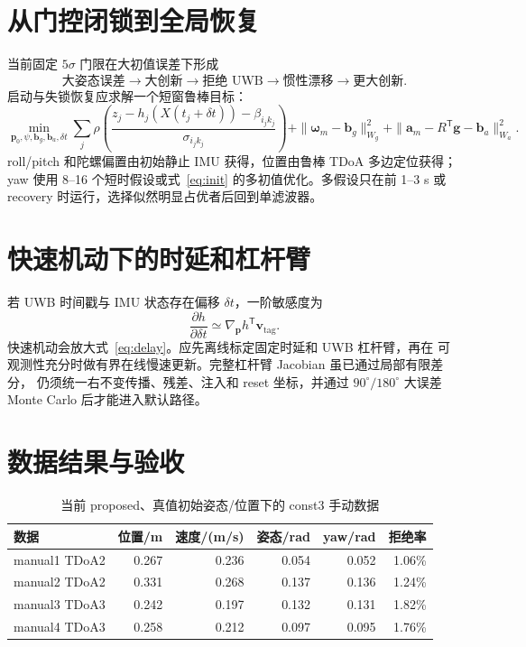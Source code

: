 \documentclass[11pt,a4paper]{ctexart}
\begin{document}
\section{从门控闭锁到全局恢复}

当前固定 $5\sigma$ 门限在大初值误差下形成
\[
\text{大姿态误差}\to\text{大创新}\to\text{拒绝 UWB}
\to\text{惯性漂移}\to\text{更大创新}.
\]
启动与失锁恢复应求解一个短窗鲁棒目标：
\begin{equation}
\min_{\bm p_0,\psi,\bm b_g,\bm b_a,\delta t}
\sum_j
\rho\!\left(
\frac{
z_j-h_j(X(t_j+\delta t))-\beta_{i_jk_j}
}{\sigma_{i_jk_j}}
\right)
+\|\bm\omega_m-\bm b_g\|_{W_g}^2
+\|\bm a_m-R^{\mathsf T}\bm g-\bm b_a\|_{W_a}^2.
\label{eq:init}
\end{equation}
roll/pitch 和陀螺偏置由初始静止 IMU 获得，位置由鲁棒 TDoA 多边定位获得；
yaw 使用 8--16 个短时假设或式~\eqref{eq:init} 的多初值优化。多假设只在前
1--3 s 或 recovery 时运行，选择似然明显占优者后回到单滤波器。

\section{快速机动下的时延和杠杆臂}

若 UWB 时间戳与 IMU 状态存在偏移 $\delta t$，一阶敏感度为
\begin{equation}
\frac{\partial h}{\partial\delta t}
\simeq
\nabla_{\bm p}h^{\mathsf T}\bm v_{\mathrm{tag}}.
\label{eq:delay}
\end{equation}
快速机动会放大式~\eqref{eq:delay}。应先离线标定固定时延和 UWB 杠杆臂，再在
可观测性充分时做有界在线慢速更新。完整杠杆臂 Jacobian 虽已通过局部有限差分，
仍须统一右不变传播、残差、注入和 reset 坐标，并通过 $90^\circ/180^\circ$
大误差 Monte Carlo 后才能进入默认路径。

\section{数据结果与验收}

\begin{table}[htbp]
\centering
\caption{当前 proposed、真值初始姿态/位置下的 const3 手动数据}
\begin{tabular}{lrrrrr}
\toprule
数据 & 位置/m & 速度/(m/s) & 姿态/rad & yaw/rad & 拒绝率\\
\midrule
manual1 TDoA2 & 0.267 & 0.236 & 0.054 & 0.052 & 1.06\%\\
manual2 TDoA2 & 0.331 & 0.268 & 0.137 & 0.136 & 1.24\%\\
manual3 TDoA3 & 0.242 & 0.197 & 0.132 & 0.131 & 1.82\%\\
manual4 TDoA3 & 0.258 & 0.212 & 0.097 & 0.095 & 1.76\%\\
\bottomrule
\end{tabular}
\end{table}
\end{document}

